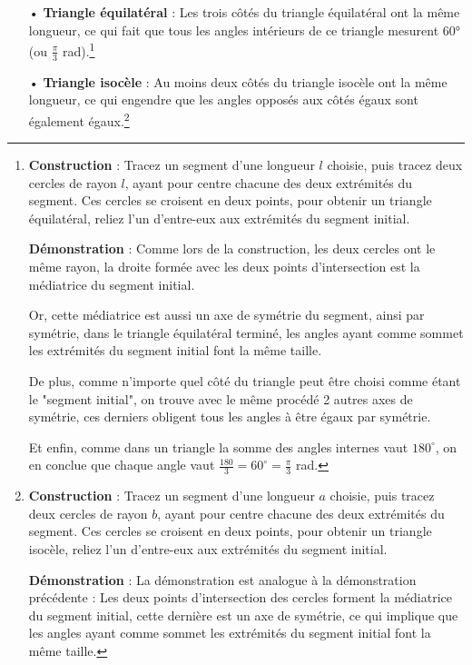 \documentclass[a4paper, twoside]{article}
\begin{document}
\begin{itemize}
	\item[•] \textbf{Triangle équilatéral} :
	      Les trois côtés du triangle équilatéral ont la même longueur,
	      ce qui fait que tous les angles intérieurs de ce triangle mesurent 60°
	      (ou $\frac{\pi}{3}$ rad).\footnote{
		      \textbf{Construction} : Tracez un segment d'une longueur $l$ choisie,
		      puis tracez deux cercles de rayon $l$, ayant pour centre chacune des deux extrémités du segment.
		      Ces cercles se croisent en deux points,
		      pour obtenir un triangle équilatéral,
		      reliez l'un d'entre-eux aux extrémités du segment initial.

		      \smallbreak

		      \textbf{Démonstration} : Comme lors de la construction,
		      les deux cercles ont le même rayon,
		      la droite formée avec les deux points d'intersection est la médiatrice du segment initial.

		      Or, cette médiatrice est aussi un axe de symétrie du segment,
		      ainsi par symétrie, dans le triangle équilatéral terminé,
		      les angles ayant comme sommet les extrémités du segment initial font la même taille.

		      De plus, comme n'importe quel côté du triangle peut être choisi comme étant le "segment initial",
		      on trouve avec le même procédé 2 autres axes de symétrie,
		      ces derniers obligent tous les angles à être égaux par symétrie.

		      Et enfin, comme dans un triangle la somme des angles internes vaut $180^\circ$,
		      on en conclue que chaque angle vaut $\frac{180}{3} = 60^\circ = \frac{\pi}{3}$ rad.

		      \smallbreak
	      }
	\item[•] \textbf{Triangle isocèle} : Au moins deux côtés du triangle isocèle ont la même longueur,
	      ce qui engendre que les angles opposés aux côtés égaux sont également égaux.\footnote{
		      \textbf{Construction} : Tracez un segment d'une longueur $a$ choisie,
		      puis tracez deux cercles de rayon $b$, ayant pour centre chacune des deux extrémités du segment.
		      Ces cercles se croisent en deux points,
		      pour obtenir un triangle isocèle,
		      reliez l'un d'entre-eux aux extrémités du segment initial.

		      \smallbreak

		      \textbf{Démonstration} : La démonstration est analogue à la démonstration précédente :
		      Les deux points d'intersection des cercles forment la médiatrice du segment initial,
		      cette dernière est un axe de symétrie,
		      ce qui implique que les angles ayant comme sommet les extrémités du segment initial font la même taille.

}
\end{itemize}
\end{document}
